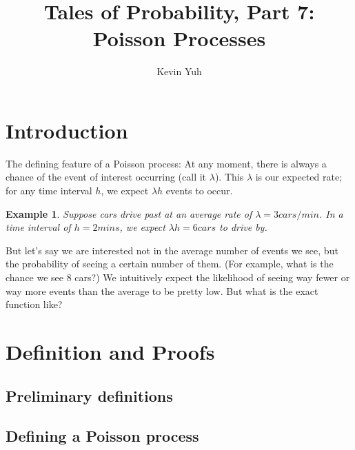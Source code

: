\documentclass{article}
\title{Tales of Probability, Part 7: Poisson Processes}
\author{Kevin Yuh}
\newtheorem{exmp}{Example}
\begin{document}
\maketitle


\section{Introduction}

The defining feature of a Poisson process: At any moment, there is always a chance of the event of interest occurring (call it $\lambda$). This $\lambda$ is our expected rate; for any time interval $h$, we expect $\lambda h$ events to occur.

\begin{exmp}
Suppose cars drive past at an average rate of $\lambda = 3 cars/min$. In a time interval of $h = 2 mins$, we expect $\lambda h = 6 cars$ to drive by. 
\end{exmp}

But let's say we are interested not in the average number of events we see, but the probability of seeing a certain number of them. (For example, what is the chance we see 8 cars?) We intuitively expect the likelihood of seeing way fewer or way more events than the average to be pretty low. But what is the exact function like?



\section{Definition and Proofs}

\subsection{Preliminary definitions}

\subsection{Defining a Poisson process}
\end{document}
